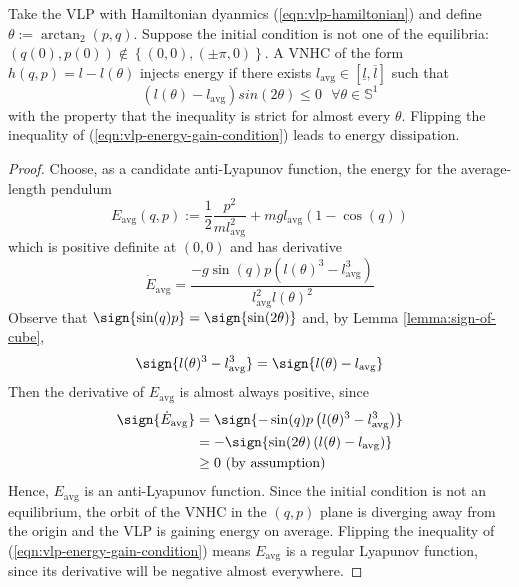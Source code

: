 \begin{thm}\label{thm:vlp-energy-stabilization}
   Take the VLP with Hamiltonian dyanmics (\ref{eqn:vlp-hamiltonian}) and define
   \(\theta := \arctan_2(p,q)\). Suppose the initial condition is not one of the
   equilibria: \((q(0),p(0)) \not \in \left\{(0,0), (\pm\pi,0)\right\}\).
   A VNHC of the form \(h(q,p) = l - l(\theta)\) injects energy if there exists 
   \(l_\text{avg} \in [\underline{l},\overline{l}]\) such that 
   \begin{equation}\label{eqn:vlp-energy-gain-condition}
      \left(l(\theta) - l_\text{avg}\right)sin(2\theta) \leq 0 \text{ }\forall \theta \in \mathbb{S}^1
   \end{equation}
   with the property that the inequality is strict for almost every \(\theta\).
   Flipping the inequality of (\ref{eqn:vlp-energy-gain-condition}) leads to
   energy dissipation.
\end{thm}
\begin{proof}
    Choose, as a candidate anti-Lyapunov function, the energy for the average-length pendulum 
    \[
       E_\text{avg}(q,p) := \frac{1}{2}\frac{p^2}{m l_\text{avg}^2} 
                    + m g l_\text{avg} (1-\cos(q))
    \]
    which is positive definite at \((0,0)\) and has derivative 
    \[
      \dot{E}_\text{avg} = \frac{-g\sin(q)p \left(l(\theta)^3 - l_\text{avg}^3\right)}
                 {l_\text{avg}^2l(\theta)^2}
    \]
    Observe that \(\sign{\sin(q)p} = \sign{\sin(2\theta)}\) and, 
    by Lemma \ref{lemma:sign-of-cube},
    \[ 
       \sign{l(\theta)^3 - l_\text{avg}^3} = \sign{ l(\theta) - l_\text{avg}}
    \]
    Then the derivative of \(E_\text{avg}\) is almost always positive, since
    \begin{align*}
       \label{eq:}
       \sign{\dot{E}_\text{avg}} &= \sign{-\sin(q)p \left(l(\theta)^3 - l_\text{avg}^3\right)} \\
                   &= -\sign{\sin(2\theta) \left(l(\theta) - l_\text{avg}\right)} \\
                   &\geq 0 \text{ (by assumption)}
    \end{align*}
    Hence, \(E_\text{avg}\) is an anti-Lyapunov function.
    Since the initial condition is not an equilibrium,
    the orbit of the VNHC in the \((q,p)\) plane is diverging away from the
    origin and the VLP is gaining energy on average.
    Flipping the inequality of (\ref{eqn:vlp-energy-gain-condition}) 
    means \(E_\text{avg}\) is a regular Lyapunov function, since its derivative
    will be negative almost everywhere.
\end{proof}


